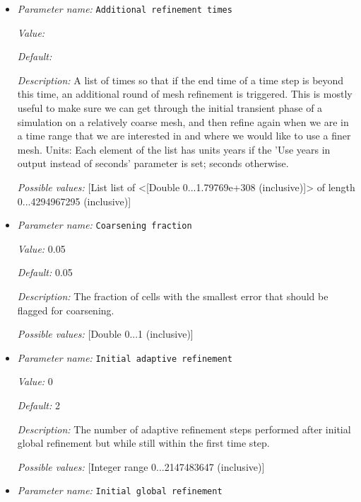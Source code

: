 \begin{itemize}
\item {\it Parameter name:} {\tt Additional refinement times}
\label{parameters:Mesh refinement/Additional refinement times}


{\it Value:} 


{\it Default:} 


{\it Description:} A list of times so that if the end time of a time step is beyond this time, an additional round of mesh refinement is triggered. This is mostly useful to make sure we can get through the initial transient phase of a simulation on a relatively coarse mesh, and then refine again when we are in a time range that we are interested in and where we would like to use a finer mesh. Units: Each element of the list has units years if the 'Use years in output instead of seconds' parameter is set; seconds otherwise.


{\it Possible values:} [List list of <[Double 0...1.79769e+308 (inclusive)]> of length 0...4294967295 (inclusive)]
\item {\it Parameter name:} {\tt Coarsening fraction}
\label{parameters:Mesh refinement/Coarsening fraction}


{\it Value:} 0.05


{\it Default:} 0.05


{\it Description:} The fraction of cells with the smallest error that should be flagged for coarsening.


{\it Possible values:} [Double 0...1 (inclusive)]
\item {\it Parameter name:} {\tt Initial adaptive refinement}
\label{parameters:Mesh refinement/Initial adaptive refinement}


{\it Value:} 0


{\it Default:} 2


{\it Description:} The number of adaptive refinement steps performed after initial global refinement but while still within the first time step.


{\it Possible values:} [Integer range 0...2147483647 (inclusive)]
\item {\it Parameter name:} {\tt Initial global refinement}
\label{parameters:Mesh refinement/Initial global refinement}



\end{itemize}
